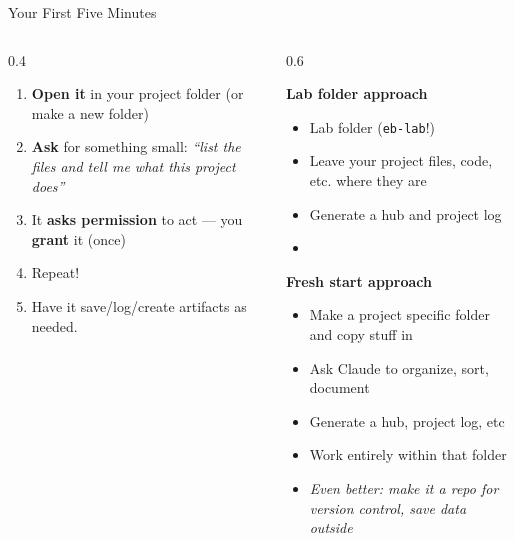 \documentclass[aspectratio=169, 10pt]{beamer}
\begin{document}
\begin{frame}[fragile]{Your First Five Minutes}
\vskip2pt
\begin{columns}[T]
\begin{column}{0.4\textwidth}
\begin{tcolorbox}[keybox, title={\faPlay\quad Starting off}, top=3pt, bottom=3pt]
\small
\begin{enumerate}\setlength{\itemsep}{4pt}
  \item \textbf{Open it} in your project folder (or make a new folder)
  \item \textbf{Ask} for something small: \textit{``list the files and tell me what this project does''}
  \item It \textbf{asks permission} to act --- you \textbf{grant} it (once)
  \item Repeat!
  \item Have it save/log/create artifacts as needed.
\end{enumerate}
\end{tcolorbox}
\end{column}
\begin{column}{0.6\textwidth}
\begin{tcolorbox}[accentbox, top=3pt, bottom=3pt]
\small
\textbf{Lab folder approach}
\vskip3pt
\begin{itemize}
\item Lab folder (\texttt{eb-lab}!) 
\item Leave your project files, code, etc. where they are 
\item Generate a hub and project log
\item
\end{itemize}
\end{tcolorbox}
\vskip4pt
\begin{tcolorbox}[accentbox, top=3pt, bottom=3pt]
\small
\textbf{Fresh start approach}
\vskip3pt
\begin{itemize}
\item Make a project specific folder and copy stuff in
\item Ask Claude to organize, sort, document 
\item Generate a hub, project log, etc
\item Work entirely within that folder
\item \textit{Even better: make it a repo for version control, save data outside}
\end{itemize}
\end{tcolorbox}
\end{column}
\end{columns}
\end{frame}
\end{document}
